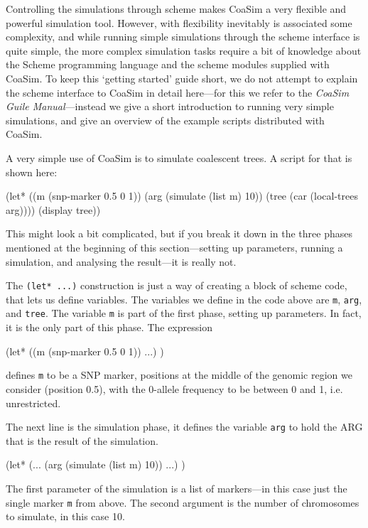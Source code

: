 \documentclass{manual}
\begin{document}
Controlling the simulations through scheme makes CoaSim a very
flexible and powerful simulation tool. However, with flexibility
inevitably is associated some complexity, and while running simple
simulations through the scheme interface is quite simple, the more
complex simulation tasks require a bit of knowledge about the Scheme
programming language and the scheme modules supplied with CoaSim.  To
keep this `getting started' guide short, we do not attempt to explain
the scheme interface to CoaSim in detail here---for this we refer to
the \emph{CoaSim Guile Manual}---instead we give a short introduction
to running very simple simulations, and give an overview of the
example scripts distributed with CoaSim.

A very simple use of CoaSim is to simulate coalescent trees.  A script
for that is shown here:
\begin{code}
(let* ((m (snp-marker 0.5 0 1))
       (arg (simulate (list m) 10))
       (tree (car (local-trees arg))))
  (display tree))
\end{code}
This might look a bit complicated, but if you break it down in the
three phases mentioned at the beginning of this section---setting up
parameters, running a simulation, and analysing the result---it is
really not.

The \verb?(let* ...)? construction is just a way of creating a block
of scheme code, that lets us define variables.  The variables we
define in the code above are \texttt{m}, \texttt{arg}, and
\texttt{tree}.  The variable \texttt{m} is part of the first phase,
setting up parameters.  In fact, it is the only part of this phase.
The expression
\begin{code}
(let* ((m (snp-marker 0.5 0 1))
       ...)
  )
\end{code}
defines \texttt{m} to be a SNP marker, positions at the middle of the
genomic region we consider (position 0.5), with the 0-allele frequency
to be between 0 and 1, i.e. unrestricted.

The next line is the simulation phase, it defines the variable
\texttt{arg} to hold the ARG that is the result of the simulation.
\begin{code}
(let* (...
       (arg (simulate (list m) 10))
       ...)
  )
\end{code}

The first parameter of the simulation is a list of markers---in this
case just the single marker \texttt{m} from above.  The second
argument is the number of chromosomes to simulate, in this case 10.
\end{document}
